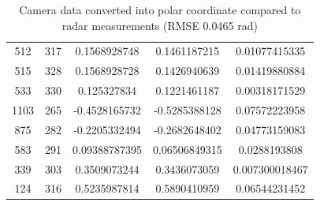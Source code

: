 \begin{table}[htbp]
\begin{tabular}{|c|c|c|c|c|}
        512 & 317 & 0.1568928748 & 0.1461187215 & 0.01077415335 \\
        515 & 328 & 0.1568928728 & 0.1426940639 & 0.01419880884 \\
        533 & 330 & 0.125327834 & 0.1221461187 & 0.00318171529 \\
        1103 & 265 & -0.4528165732 & -0.5285388128 & 0.07572223958 \\
        875 & 282 & -0.2205332494 & -0.2682648402 & 0.04773159083 \\
        583 & 291 & 0.09388787395 & 0.06506849315 & 0.0288193808 \\
        339 & 303 & 0.3509073244 & 0.3436073059 & 0.007300018467 \\
        124 & 316 & 0.5235987814 & 0.5890410959 & 0.06544231452 \\
    \hline
\end{tabular}
\caption{Camera data converted into polar coordinate compared to radar measurements (RMSE 0.0465 rad)}
\label{tab:cam_radar_data}
\end{table}

